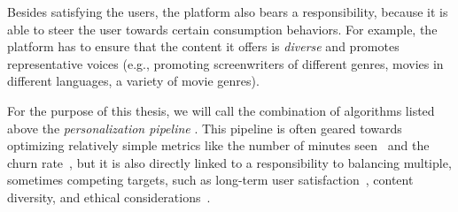 Besides satisfying the users, the platform also bears a responsibility, because it is able to steer the user towards certain consumption behaviors. For example, the platform has to ensure that the content it offers is \emph{diverse} and promotes representative voices (e.g., promoting screenwriters of different genres, movies in different languages, a variety of movie genres). %

For the purpose of this thesis, we will call the combination of algorithms listed above the \emph{personalization pipeline} . 
This pipeline is often geared towards optimizing relatively simple metrics like the number of minutes seen~\cite{spotifyIntent} and the churn rate~\cite{oldChurn}, but it is also directly linked to a responsibility to balancing multiple, sometimes competing targets, such as long-term user satisfaction~\cite{longTerm}, content diversity, and  ethical considerations~\cite{helberger}.


